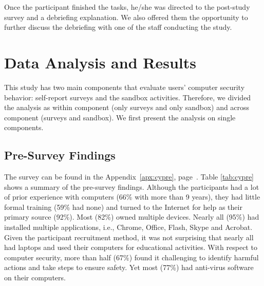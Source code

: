 Once the participant finished the tasks, he/she was directed to the post-study survey and a
debriefing explanation. We also offered them the opportunity to further discuss the debriefing with one of the staff conducting the study.


\section{Data Analysis and Results}
This study has two main components that evaluate users' computer security behavior: self-report surveys and the sandbox activities. Therefore, we divided the analysis as within component (only surveys and only sandbox) and across component (surveys and sandbox). We first present the analysis on single components.

\subsection{Pre-Survey Findings}
The survey can be found in the Appendix~\ref{apx:cypre}, page~\pageref{apx:cypre}.
Table \ref{tab:cypre} shows a summary of the pre-survey findings. 
Although the participants had a lot of prior experience with computers (66\% with more than 9 years), they had little formal training (59\% had none) and turned to the Internet for help as their primary source (92\%). 
Most (82\%) owned multiple devices. 
Nearly all (95\%) had installed multiple applications, i.e., Chrome, Office, Flash, Skype and Acrobat. 
Given the participant recruitment method, it was not surprising that nearly all had laptops and used their computers for educational activities. With respect to computer security, more than half (67\%) found it challenging to identify harmful actions and take steps to ensure safety. 
Yet most (77\%) had anti-virus software on their computers.

